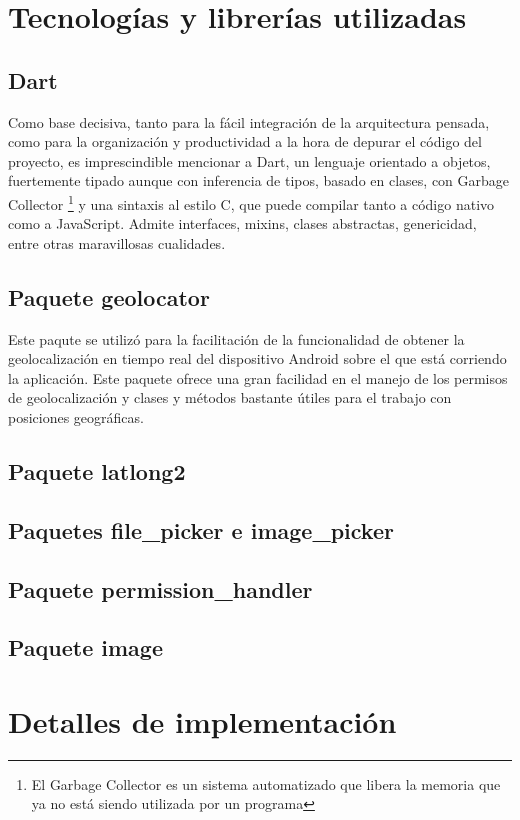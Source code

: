 \section{Tecnologías y librerías utilizadas}
\subsection{Dart}
Como base decisiva, tanto para la fácil integración de la arquitectura pensada, como para la organización y productividad a la hora de depurar el código del proyecto,
es imprescindible mencionar a Dart, un lenguaje orientado a objetos, fuertemente tipado aunque con inferencia de tipos, basado en clases, con Garbage Collector
\footnote{El Garbage Collector es un sistema automatizado que libera la memoria que ya no está siendo utilizada por un programa}
y una sintaxis al estilo C, que puede compilar tanto a código nativo como a JavaScript. Admite interfaces, mixins, clases abstractas, genericidad, entre otras maravillosas cualidades. \cite{dartOficial}
\subsection{Paquete geolocator}
Este paqute se utilizó para la facilitación de la funcionalidad de obtener la geolocalización en tiempo real del dispositivo Android sobre el que está corriendo la aplicación.
Este paquete ofrece una gran facilidad en el manejo de los permisos de geolocalización y clases y métodos bastante útiles para el trabajo con posiciones geográficas.
\subsection{Paquete latlong2}

\subsection{Paquetes file\_picker e image\_picker}
\subsection{Paquete permission\_handler}
\subsection{Paquete image}
\section{Detalles de implementación}

